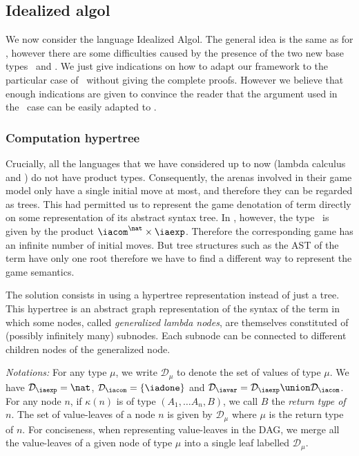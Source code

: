 \subsection{Idealized algol}

We now consider the language Idealized Algol. The general idea is the same as for \pcf, however there are some difficulties caused by the presence of the two new
base types \iavar\ and \iacom. We just give indications on how to
adapt our framework to the particular case of \ialgol\ without
giving the complete proofs. However we believe that enough
indications are given to convince the reader that the argument used
in the \pcf\ case can be easily adapted to \ialgol.

\subsubsection{Computation hypertree}
Crucially, all the languages that we have considered up to now (lambda calculus and \pcf) do not have product types. Consequently, the arenas involved in their game model only have a single initial move at most, and therefore they can be
regarded as trees. This had permitted us to represent the game denotation of term directly on some representation of its abstract syntax tree. In \ialgol, however, the type \iavar\ is given by the product $\iacom^{\nat} \times \iaexp$. Therefore the corresponding game has an infinite number of initial moves. But tree structures such as the AST of the term have only one root therefore we have to find a different way to represent the game semantics.

The solution consists in using a hypertree representation instead of just a tree. This hypertree is an abstract graph representation of the syntax of the term in which some nodes, called \emph{generalized lambda nodes}, are themselves constituted of (possibly infinitely many) subnodes. Each subnode can be connected to different children nodes of the generalized node.


\emph{Notations:} For any type $\mu$, we write
$\mathcal{D}_\mu$ to denote the set of values of type $\mu$.
We have $\mathcal{D}_{\iaexp} = \nat$,
$\mathcal{D}_{\iacom} = \{ \iadone \}$
and $\mathcal{D}_{\iavar} = \mathcal{D}_{\iaexp} \union \mathcal{D}_{\iacom}$. For any node $n$, if $\kappa(n)$ is of type $(A_1,\ldots A_n,B)$, we call $B$ the \emph{return type of $n$}. The set of value-leaves of a node $n$ is given by $\mathcal{D}_{\mu}$ where $\mu$ is the return type of $n$.
For conciseness, when representing value-leaves in the DAG, we merge all the value-leaves of a given node of type $\mu$ into a single leaf labelled $\mathcal{D}_\mu$.

